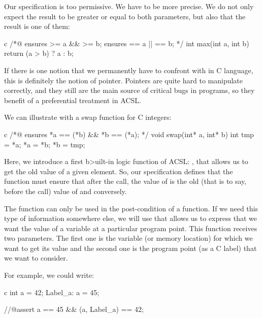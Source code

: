 \documentclass[middle]{zmdocument}
\begin{document}
Our specification is too permissive. We have to be more precise. We do
not only expect the result to be greater or equal to both parameters,
but also that the result is one of them:



\begin{CodeBlock}{c}
/*@
  ensures \result >= a && \result >= b;
  ensures \result == a || \result == b;
*/
int max(int a, int b){
  return (a > b) ? a : b;
}
\end{CodeBlock}





If there is one notion that we permanently have to confront with in C
language, this is definitely the notion of pointer. Pointers are quite
hard to manipulate correctly, and they still are the main source of
critical bugs in programs, so they benefit of a preferential treatment
in ACSL.

We can illustrate with a swap function for C integers:



\begin{CodeBlock}{c}
/*@
  ensures *a == \old(*b) && *b == \old(*a);
*/
void swap(int* a, int* b){
  int tmp = *a;
  *a = *b;
  *b = tmp;
}
\end{CodeBlock}





Here, we introduce a first b>uilt-in logic function of ACSL:
, that allows us to get the old value of a given element.
So, our specification defines that the function must ensure that after
the call, the value of  is the old (that is to say, before
the call) value of  and conversely.

The  function can only be used in the
post-condition of a function. If we need this type of information
somewhere else, we will use  that allows us to express that
we want the value of a variable at a particular program point. This
function receives two parameters. The first one is the variable (or
memory location) for which we want to get its value and the second one
is the program point (as a C label) that we want to consider.

For example, we could write:



\begin{CodeBlock}{c}
  int a = 42;
 Label_a:
  a = 45;

  //@assert a == 45 && \at(a, Label_a) == 42;
\end{CodeBlock}
\end{document}
